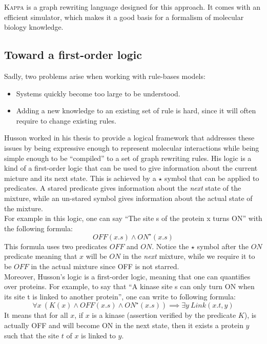 \documentclass[10pt,a4paper]{article}
\newcommand\Kappa{\textsc{Kappa}}
\begin{document}
\Kappa{}\cite{kappa} is a graph rewriting language designed for this approach. It comes with an efficient simulator, which makes it a good basis for a formalism of molecular biology knowledge.

\subsection{Toward a first-order logic}
 Sadly, two problems arise when working with rule-bases models:
\begin{itemize}
\item Systems quickly become too large to be understood.
\item Adding a new knowledge to an existing set of rule is hard, since it will often require to change existing rules.
\end{itemize}

Husson worked in his thesis\cite{husson} to provide a logical framework that addresses these
issues by being expressive enough to represent molecular interactions while being simple enough to be ``compiled'' to a set of graph rewriting rules. His logic is a kind of a first-order logic that can be used to give information about the current micture and its next state. This is achieved by a $\star$ symbol that can be applied to predicates. A stared predicate gives information about the \emph{next} state of the mixture, while an un-stared symbol gives information about the actual state of the mixture.\\

For example in this logic, one can say ``The site s of the protein x turns ON'' with the following formula:
$$ OFF(x.s) \land ON^\star(x.s) $$
This formula uses two predicates $OFF$ and $ON$. Notice the $\star$ symbol after the $ON$ predicate meaning that $x$ will be $ON$ in the \emph{next} mixture, while we require it to be $OFF$ in the actual mixture since OFF is not starred.\\

Moreover, Husson's logic is a first-order logic, meaning that one can quantifies over proteins. For example, to say that ``A kinase site s can only turn ON when its site t is linked to another protein'', one can write to following formula:
$$ \forall x\ (K(x) \land OFF(x.s) \land ON^\star(x.s)) \implies \exists y\ Link(x.t,y) $$
It means that for all $x$, if $x$ is a kinase (assertion verified by the predicate $K$), is actually OFF and will become ON in the next state, then it exists a protein $y$ such that the site $t$ of $x$ is linked to $y$.\\
\end{document}
